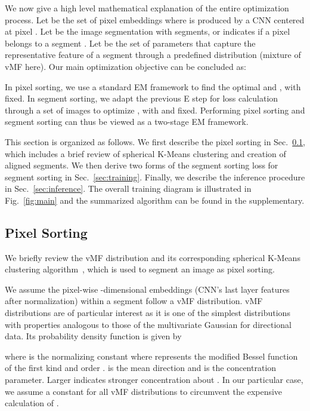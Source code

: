 \documentclass[10pt,twocolumn,letterpaper]{article}
\begin{document}
We now give a high level mathematical explanation of the entire optimization process.
Let  be the set of pixel embeddings where  is produced by a CNN  centered at pixel . Let  be the image segmentation with  segments, or  indicates if a pixel  belongs to a segment . Let  be the set of parameters that capture the representative feature of a segment through a predefined distribution  (mixture of vMF here).
Our main optimization objective can be concluded as:

In pixel sorting, we use a standard EM framework to find the optimal  and , with  fixed. In segment sorting, we adapt the previous E step for loss calculation through a set of images to optimize , with  and  fixed. Performing pixel sorting and segment sorting can thus be viewed as a two-stage EM framework.


This section is organized as follows.
We first describe the pixel sorting in Sec.~\ref{sec:clustering}, which includes a brief review of spherical K-Means clustering and creation of aligned segments.
We then derive two forms of the segment sorting loss for segment sorting in Sec.~\ref{sec:training}.
Finally, we describe the inference procedure in Sec.~\ref{sec:inference}.
The overall training diagram is illustrated in Fig.~\ref{fig:main} and the summarized algorithm can be found in the supplementary.





\subsection{Pixel Sorting}
\label{sec:clustering}

We briefly review the vMF distribution and its corresponding spherical K-Means clustering algorithm~\cite{banerjee2005clustering}, which is used to segment an image as pixel sorting.


We assume the pixel-wise -dimensional embeddings  (CNN's last layer features after normalization) within a segment follow a vMF distribution.
vMF distributions are of particular interest as it is one of the simplest distributions with properties analogous to those of the multivariate Gaussian for directional data.
Its probability density function is given by

where 
is the normalizing constant where  represents the modified Bessel function of the first kind and order .
 is the mean direction and  is the concentration parameter.
Larger  indicates stronger concentration about .
In our particular case, we assume a constant  for all vMF distributions to circumvent the expensive calculation of .
\end{document}
